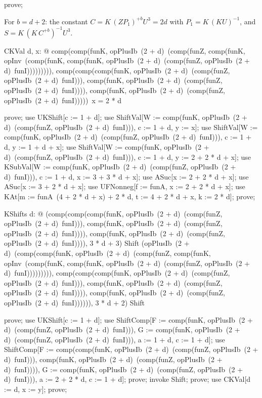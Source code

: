 \documentclass{article}
\begin{document}
\begin{zproof}
prove;
\end{zproof}

For $b = d + 2$: the constant $C = K\,(Z P_1)^{+b} U^3 = 2d$ with $P_1 = K\,(K U)^{-1}$, and
$S = K\,(K\,C^{+b})^{-1} U^3$.

\begin{theorem}{CKVal}
  \forall d, x: \nat @ comp(comp(funK, opPlusIb~(2 + d)~(comp(funZ, comp(funK, opInv~(comp(funK, comp(funK, opPlusIb~(2 + d)~(comp(funZ, opPlusIb~(2 + d)~funI))))))))), comp(comp(comp(funK, opPlusIb~(2 + d)~(comp(funZ, opPlusIb~(2 + d)~funI))), comp(funK, opPlusIb~(2 + d)~(comp(funZ, opPlusIb~(2 + d)~funI)))), comp(funK, opPlusIb~(2 + d)~(comp(funZ, opPlusIb~(2 + d)~funI)))))~x = 2 * d
\end{theorem}

\begin{zproof}
prove;
use UKShift[c := 1 + d];
use ShiftVal[W := comp(funK, opPlusIb~(2 + d)~(comp(funZ, opPlusIb~(2 + d)~funI))), c := 1 + d, y := x];
use ShiftVal[W := comp(funK, opPlusIb~(2 + d)~(comp(funZ, opPlusIb~(2 + d)~funI))), c := 1 + d, y := 1 + d + x];
use ShiftVal[W := comp(funK, opPlusIb~(2 + d)~(comp(funZ, opPlusIb~(2 + d)~funI))), c := 1 + d, y := 2 + 2 * d + x];
use KSubVal[W := comp(funK, opPlusIb~(2 + d)~(comp(funZ, opPlusIb~(2 + d)~funI))), c := 1 + d, x := 3 + 3 * d + x];
use ASuc[x := 2 + 2 * d + x];
use ASuc[x := 3 + 2 * d + x];
use UFNonneg[f := funA, x := 2 + 2 * d + x];
use KAt[m := funA~(4 + 2 * d + x) + 2 * d, t := 4 + 2 * d + x, k := 2 * d];
prove;
\end{zproof}

\begin{theorem}{KShifts}
  \forall d: \nat @ (comp(comp(comp(funK, opPlusIb~(2 + d)~(comp(funZ, opPlusIb~(2 + d)~funI))), comp(funK, opPlusIb~(2 + d)~(comp(funZ, opPlusIb~(2 + d)~funI)))), comp(funK, opPlusIb~(2 + d)~(comp(funZ, opPlusIb~(2 + d)~funI)))), 3 * d + 3) \in Shift \land (opPlusIb~(2 + d)~(comp(comp(funK, opPlusIb~(2 + d)~(comp(funZ, comp(funK, opInv~(comp(funK, comp(funK, opPlusIb~(2 + d)~(comp(funZ, opPlusIb~(2 + d)~funI))))))))), comp(comp(comp(funK, opPlusIb~(2 + d)~(comp(funZ, opPlusIb~(2 + d)~funI))), comp(funK, opPlusIb~(2 + d)~(comp(funZ, opPlusIb~(2 + d)~funI)))), comp(funK, opPlusIb~(2 + d)~(comp(funZ, opPlusIb~(2 + d)~funI)))))), 3 * d + 2) \in Shift
\end{theorem}

\begin{zproof}
prove;
use UKShift[c := 1 + d];
use ShiftComp[F := comp(funK, opPlusIb~(2 + d)~(comp(funZ, opPlusIb~(2 + d)~funI))), G := comp(funK, opPlusIb~(2 + d)~(comp(funZ, opPlusIb~(2 + d)~funI))), a := 1 + d, c := 1 + d];
use ShiftComp[F := comp(comp(funK, opPlusIb~(2 + d)~(comp(funZ, opPlusIb~(2 + d)~funI))), comp(funK, opPlusIb~(2 + d)~(comp(funZ, opPlusIb~(2 + d)~funI)))), G := comp(funK, opPlusIb~(2 + d)~(comp(funZ, opPlusIb~(2 + d)~funI))), a := 2 + 2 * d, c := 1 + d];
prove;
invoke Shift;
prove;
use CKVal[d := d, x := y];
prove;
\end{zproof}
\end{document}
